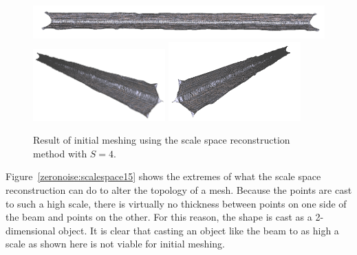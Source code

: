 \documentclass[12pt]{drexelthesis}
\begin{document}
\begin{figure}[!ht]
	\centering
		\includegraphics[width=5in]{simulated-lab-scan/0noise/cleanNeat/scalespace400.png}
		\includegraphics[width=2in]{simulated-lab-scan/0noise/cleanNeat/scalespace401.png}
		\includegraphics[width=2in]{simulated-lab-scan/0noise/cleanNeat/scalespace402.png}
		\caption[Initial meshing using a scale space reconstruction with $S = 4$]{\centering  Result of initial meshing using the scale space reconstruction method with $S = 4$.}
		\label{zeronoise:scalespace4}
\end{figure}

Figure~\ref{zeronoise:scalespace15} shows the extremes of what the scale space reconstruction can do to alter the topology of a mesh. Because the points are cast to such a high scale, there is virtually no thickness between points on one side of the beam and points on the other. For this reason, the shape is cast as a 2-dimensional object. It is clear that casting an object like the beam to as high a scale as shown here is not viable for initial meshing. 
\end{document}
